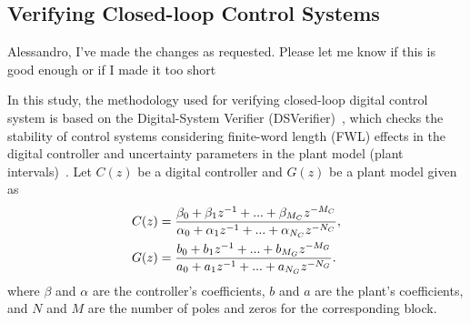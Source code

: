 \documentclass{sig-alternate-05-2015}
\newcommand{\red}[1]{{\color{red}#1}}
\begin{document}
{%
}

\subsection{Verifying Closed-loop Control Systems}
\label{verifying-closed-loop-control-systems}

\red{Alessandro, I've made the changes as requested. Please let me know if this is good enough or if I made it too short}

In this study, the methodology used for verifying closed-loop digital
control system is based on the Digital-System Verifier
(DSVerifier)~\cite{IsmailBCFF15}, which checks the stability of control
systems considering finite-word length (FWL) effects in the digital
controller and uncertainty parameters in the plant model (plant
intervals)~\cite{Bessa16}.  Let $C(z)$ be a digital controller and $G(z)$ be
a plant model given as
%
\begin{align}
\small
\label{controller_plant_tf}
C(z)&=\frac{\beta_{0}+\beta_{1}z^{-1}+...+\beta_{M_C}z^{-M_C}}{\alpha_{0}+\alpha_{1}z^{-1}+...+\alpha_{N_C}z^{-N_C}}, \\
G(z)&=\frac{b_{0}+b_{1}z^{-1}+...+b_{M_G}z^{-M_G}}{a_{0}+a_{1}z^{-1}+...+a_{N_G}z^{-N_G}}.
\end{align}
%
\noindent where $\beta$ and $\alpha$ are the controller's coefficients, $b$
and $a$ are the plant's coefficients, and $N$ and $M$ are the number of poles and zeros for the corresponding block.  
\end{document}
